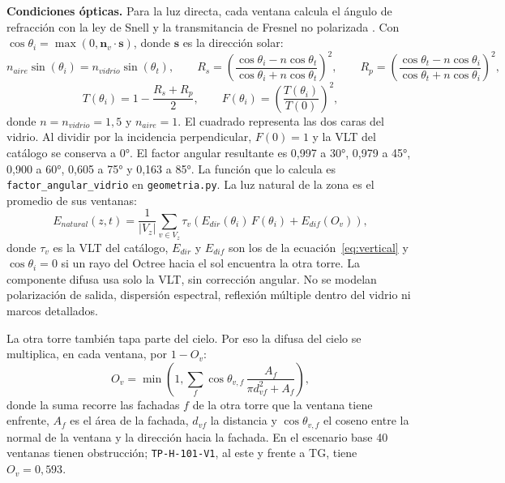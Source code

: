 \documentclass[12pt,a4paper]{article}
\newcommand{\codigo}[1]{\texttt{#1}}
\begin{document}
\textbf{Condiciones ópticas.} Para la luz directa, cada ventana calcula el ángulo de refracción con la ley de Snell y la transmitancia de Fresnel no polarizada \cite{hecht2017,edmundOptics}. Con $\cos\theta_i=\max(0,\mathbf n_v\cdot\mathbf s)$, donde $\mathbf s$ es la dirección solar:
\begin{equation}
 n_{aire}\sin(\theta_i)=n_{vidrio}\sin(\theta_t),\qquad
 R_s=\left(\frac{\cos\theta_i-n\cos\theta_t}{\cos\theta_i+n\cos\theta_t}\right)^2,\qquad
 R_p=\left(\frac{\cos\theta_t-n\cos\theta_i}{\cos\theta_t+n\cos\theta_i}\right)^2,
 \label{eq:snell}
\end{equation}
\begin{equation}
 T(\theta_i)=1-\frac{R_s+R_p}{2},\qquad
 F(\theta_i)=\left(\frac{T(\theta_i)}{T(0)}\right)^2,
 \label{eq:fresnel}
\end{equation}
donde $n=n_{vidrio}=1,5$ y $n_{aire}=1$. El cuadrado representa las dos caras del vidrio. Al dividir por la incidencia perpendicular, $F(0)=1$ y la VLT del catálogo se conserva a 0°. El factor angular resultante es 0,997 a 30°, 0,979 a 45°, 0,900 a 60°, 0,605 a 75° y 0,163 a 85°. La función que lo calcula es \codigo{factor\_angular\_vidrio} en \codigo{geometria.py}. La luz natural de la zona es el promedio de sus ventanas:
\begin{equation}
 E_{natural}(z,t)=\frac{1}{|V_z|}\sum_{v\in V_z}\tau_v\left(E_{dir}(\theta_i)\,F(\theta_i)+E_{dif}(O_v)\right),
 \label{eq:natural}
\end{equation}
donde $\tau_v$ es la VLT del catálogo, $E_{dir}$ y $E_{dif}$ son los de la ecuación~\ref{eq:vertical} y $\cos\theta_i=0$ si un rayo del Octree hacia el sol encuentra la otra torre. La componente difusa usa solo la VLT, sin corrección angular. No se modelan polarización de salida, dispersión espectral, reflexión múltiple dentro del vidrio ni marcos detallados.

La otra torre también tapa parte del cielo. Por eso la difusa del cielo se multiplica, en cada ventana, por $1-O_v$:
\begin{equation}
 O_v=\min\left(1,\sum_{f}\cos\theta_{v,f}\,\frac{A_f}{\pi d_{vf}^{2}+A_f}\right),
 \label{eq:obstruccion}
\end{equation}
donde la suma recorre las fachadas $f$ de la otra torre que la ventana tiene enfrente, $A_f$ es el área de la fachada, $d_{vf}$ la distancia y $\cos\theta_{v,f}$ el coseno entre la normal de la ventana y la dirección hacia la fachada. En el escenario base 40 ventanas tienen obstrucción; \codigo{TP-H-101-V1}, al este y frente a TG, tiene $O_v=0,593$.
\end{document}
